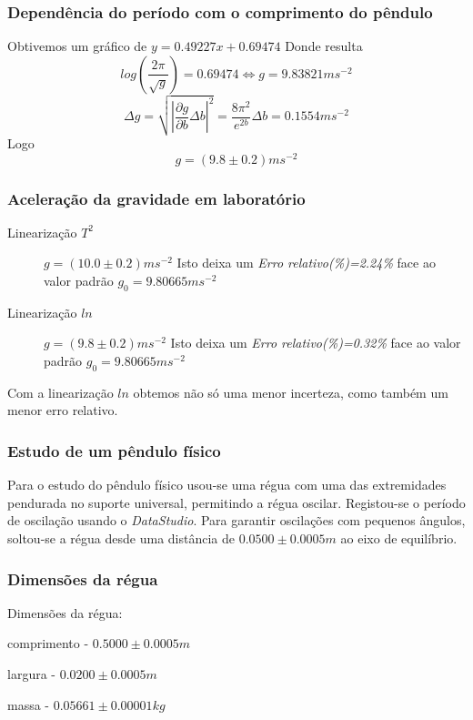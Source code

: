 \documentclass{beamer}
\begin{document}
\begin{frame}
	\frametitle{Dependência do período com o comprimento do pêndulo}
	Obtivemos um gráfico de $ y=0.49227x+0.69474$
	Donde resulta
	$$ log\left(\frac{2\pi}{\sqrt{g}}\right)=0.69474 \iff g=9.83821ms^{-2}
	$$
	$$ \Delta g = \sqrt{\left|\frac{\partial g}{\partial b}\Delta b \right|^2}=\frac{8\pi^2}{e^{2b}}\Delta 			b=0.1554 ms^{-2}
	$$
	 Logo $$ g=(9.8\pm0.2)ms^{-2}
	$$
\end{frame}

\begin{frame}
	\frametitle{Aceleração da gravidade em laboratório}
	\begin{description}
	\item[Linearização $T^2$]$g=(10.0\pm0.2)ms^{-2}$ Isto deixa um \textit{Erro relativo(\%)=2.24\%} face ao valor padrão $g_0=9.80665ms^{-2} $ 
	
	\item[Linearização $ln$]$g=(9.8\pm0.2)ms^{-2}$ Isto deixa um \textit{Erro relativo(\%)=0.32\%} face ao valor padrão $g_0=9.80665ms^{-2} $
	\end{description}
	Com a linearização $ln$ obtemos não só uma menor incerteza, como também um menor erro relativo.
\end{frame}



\begin{frame}
	\frametitle{Estudo de um pêndulo físico}
		\begin{flushleft}
			Para o estudo do pêndulo físico usou-se uma régua com uma das extremidades pendurada no suporte universal, 			permitindo a régua oscilar. Registou-se o período de oscilação usando o \textit{DataStudio}. Para garantir 			oscilações com pequenos ângulos, soltou-se a régua desde uma distância de  $0.0500 \pm 0.0005 m $ ao eixo de 		equilíbrio.
	\end{flushleft}
\end{frame}

\begin{frame}
	\frametitle{Dimensões da régua}
	Dimensões da régua:
	\begin{description}
		\item comprimento - $ 0.5000\pm0.0005m$
		\item largura - $0.0200\pm0.0005m$
		\item massa - $0.05661\pm0.00001kg$
	\end{description}
\end{frame}
\end{document}
